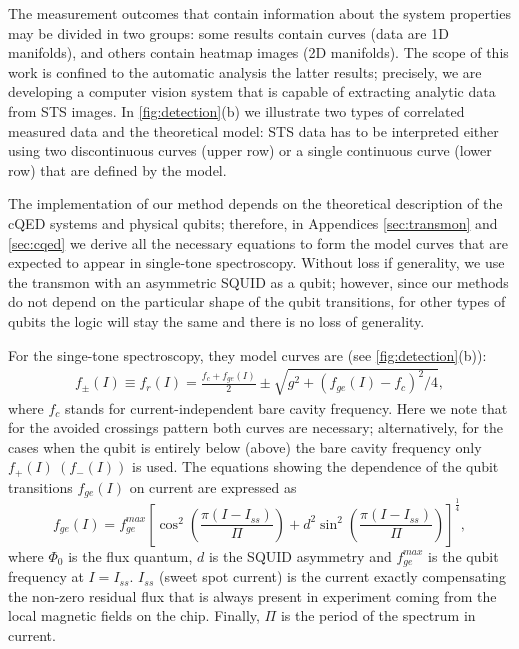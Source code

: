 \documentclass[%
 aip,
 draft,
 amsmath,amssymb,
 reprint,%
]{revtex4-1}
\begin{document}
The measurement outcomes that contain information about the system properties may be divided in two groups: some results contain curves (data are 1D manifolds), and others contain heatmap images (2D manifolds). The scope of this work is confined to the automatic analysis the latter results; precisely, we are developing a computer vision system that is capable of extracting analytic data from STS images. In \autoref{fig:detection}(b) we illustrate two types of correlated measured data and the theoretical model: STS data has to be interpreted either using two discontinuous curves (upper row) or a single continuous curve (lower row) that are defined by the model. 

The implementation of our method depends on the theoretical description of the cQED systems and physical qubits; therefore, in Appendices \ref{sec:transmon} and \ref{sec:cqed} we derive all the necessary equations to form the model curves that are expected to appear in single-tone spectroscopy. Without loss if generality, we use the transmon\cite{koch2007} with an asymmetric SQUID as a qubit; however, since our methods do not depend on the particular shape of the qubit transitions, for other types of qubits the logic will stay the same and there is no loss of generality.

For the singe-tone spectroscopy, they model curves are (see \autoref{fig:detection}(b)):
\begin{align}
f_\pm(I) \equiv f_r(I) = \frac{f_c + f_{ge}(I)}{2} \pm \sqrt{g^2+(f_{ge}(I) - f_c)^2/4},\label{eq:f_r}
\end{align}
where $f_c$ stands for current-independent bare cavity frequency. Here we note that for the avoided crossings pattern both curves are necessary; alternatively, for the cases when the qubit is entirely below (above) the bare cavity frequency only $ f_+(I)\ \left(f_-(I)\right)$ is used. The equations showing the dependence of the qubit transitions $f_{ge}(I)$ on current are expressed as
\begin{equation}
f_{ge}(I) = f_{ge}^{max} \left[\cos^2\left(\frac{\pi(I-I_{ss})}{\Pi}\right)+d^2 \sin^2 \left(\frac{\pi(I-I_{ss})}{\Pi}\right)\right]^\frac{1}{4},
\label{eq:tr_spectrum}
\end{equation}
where $\Phi_0$ is the flux quantum, $d$ is the SQUID asymmetry and $f_{ge}^{max}$ is the qubit frequency at $I = I_{ss}$. $I_{ss}$ (sweet spot current) is the current exactly compensating the non-zero residual flux that is always present in experiment coming from the local magnetic fields on the chip. Finally, $\Pi$ is the period of the spectrum in current.
\end{document}

